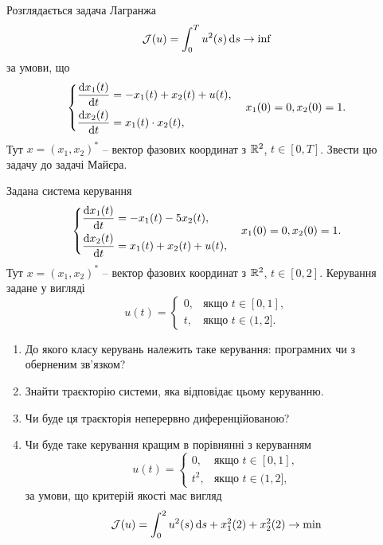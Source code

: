\begin{problem}
	Розглядається задача Лагранжа
		\[
		\mathcal{J}(u)
		=
		\int_0^T u^2(s) \mathop{}\!\mathrm{d} s \to \inf
		\]
		за умови, що
		\[
			\left\{
				\begin{aligned}
					\dfrac{\mathop{}\!\mathrm{d} x_1(t)}{\mathop{}\!\mathrm{d} t} &= -x_1(t) + x_2(t) + u(t), \\
					\dfrac{\mathop{}\!\mathrm{d} x_2(t)}{\mathop{}\!\mathrm{d} t} &= x_1(t) \cdot x_2(t),
				\end{aligned}
			\right.
			\quad
			x_1(0)=0, x_2(0)=1.
		\]
		Тут $x=(x_1,x_2)^*$ -- вектор фазових координат з $\mathbb{R}^2$, $t\in[0,T]$. Звести цю задачу до задачі Майєра.
\end{problem}



\begin{problem}
	Задана система керування \[ \left\{ \begin{aligned}
		\frac{\mathop{}\!\mathrm{d} x_1 (t)}{\mathop{}\!\mathrm{d} t} &= - x_1 (t) - 5 x_2 (t), \\
		\frac{\mathop{}\!\mathrm{d} x_2 (t)}{\mathop{}\!\mathrm{d} t} &= x_1 (t) + x_2 (t) + u(t),
	\end{aligned} \right. 
	\quad x_1 (0) = 0, x_2 (0) = 1. \]
	Тут $x = (x_1, x_2)^*$ -- вектор фазових координат з $\mathbb{R}^2$, $t \in [0, 2]$. Керування задане у вигляді \[ u(t) = \begin{cases} 0, & \text{якщо } t \in [0, 1], \\ t, & \text{якщо } t \in (1, 2]. \end{cases} \]
	\begin{enumerate}
		\item До якого класу керувань належить таке керування: програмних чи з оберненим зв'язком?

		\item Знайти траєкторію системи, яка відповідає цьому керуванню.

		\item Чи буде ця траєкторія неперервно диференційованою?

		\item Чи буде таке керування кращим в порівнянні з керуванням \[ u(t) = \begin{cases} 0, & \text{якщо } t \in [0, 1], \\ t^2, & \text{якщо } t \in (1, 2], \end{cases} \] за умови, що критерій якості має вигляд \[ \mathcal{J} (u) = \int_0^2 u^2(s) \mathop{}\!\mathrm{d} s + x_1^2 (2) + x_2^2 (2) \to \min \]
	\end{enumerate}
\end{problem}

